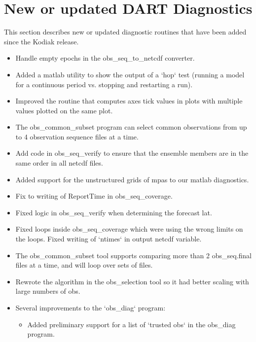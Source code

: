 \documentclass[letterpaper,10pt,english]{sphinxmanual}
\begin{document}
\section{New or updated DART Diagnostics}
\label{docs/Lanai_diffs_from_Kodiak:new-or-updated-dart-diagnostics}
This section describes new or updated diagnostic routines that have been
added since the Kodiak release.
\begin{itemize}
\item {} 
Handle empty epochs in the obs\_seq\_to\_netcdf converter.

\item {} 
Added a matlab utility to show the output of a `hop` test (running a
model for a continuous period vs. stopping and restarting a run).

\item {} 
Improved the routine that computes axes tick values in plots with
multiple values plotted on the same plot.

\item {} 
The obs\_common\_subset program can select common observations from
up to 4 observation sequence files at a time.

\item {} 
Add code in obs\_seq\_verify to ensure that the ensemble members are
in the same order in all netcdf files.

\item {} 
Added support for the unstructured grids of mpas to our matlab
diagnostics.

\item {} 
Fix to writing of ReportTime in obs\_seq\_coverage.

\item {} 
Fixed logic in obs\_seq\_verify when determining the forecast lat.

\item {} 
Fixed loops inside obs\_seq\_coverage which were using the wrong
limits on the loops. Fixed writing of `ntimes` in output netcdf
variable.

\item {} 
The obs\_common\_subset tool supports comparing more than 2
obs\_seq.final files at a time, and will loop over sets of files.

\item {} 
Rewrote the algorithm in the obs\_selection tool so it had better
scaling with large numbers of obs.

\item {} 
Several improvements to the `obs\_diag` program:
\begin{itemize}
\item {} 
Added preliminary support for a list of `trusted obs` in the
obs\_diag program.


\end{itemize}
\end{itemize}
\end{document}
